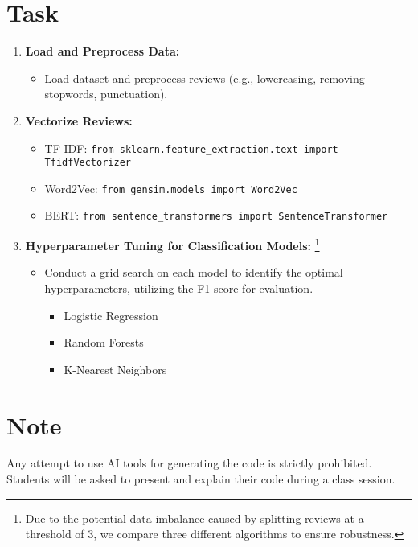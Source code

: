 \documentclass{article}
\begin{document}
	\section*{Task}
	\begin{enumerate}
		\item \textbf{Load and Preprocess Data:}
		\begin{itemize}
			\item Load dataset and preprocess reviews (e.g., lowercasing, removing stopwords, punctuation).
		\end{itemize}
		\item \textbf{Vectorize Reviews:}
		\begin{itemize}
			\item TF-IDF: \texttt{from sklearn.feature\_extraction.text import TfidfVectorizer}
			\item Word2Vec: \texttt{from gensim.models import Word2Vec}
			\item BERT: \texttt{from sentence\_transformers import SentenceTransformer}
		\end{itemize}
		\item \textbf{Hyperparameter Tuning for Classification Models:}
		\footnote{Due to the potential data imbalance caused by splitting reviews at a threshold of 3, we compare three different algorithms to ensure robustness.}
		\begin{itemize}
			\item Conduct a grid search on each model to identify the optimal hyperparameters, utilizing the F1 score for evaluation.
			\begin{itemize}
				\item Logistic Regression
				\item Random Forests
				\item K-Nearest Neighbors
			\end{itemize}
		\end{itemize}
	\end{enumerate}
	\section*{Note}
	Any attempt to use AI tools for generating the code is strictly prohibited. Students will be asked to present and explain their code during a class session.
\end{document}
